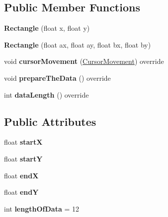 \subsection*{Public Member Functions}
\begin{DoxyCompactItemize}
\item 
{\bfseries Rectangle} (float x, float y)\hypertarget{classRectangle_afcbe2665892e9ed1d32a7400ab1b9160}{}\label{classRectangle_afcbe2665892e9ed1d32a7400ab1b9160}

\item 
{\bfseries Rectangle} (float ax, float ay, float bx, float by)\hypertarget{classRectangle_a16be353bdd049c8f642cd7d3b4156be5}{}\label{classRectangle_a16be353bdd049c8f642cd7d3b4156be5}

\item 
void {\bfseries cursor\+Movement} (\hyperlink{classCursorMovement}{Cursor\+Movement}) override\hypertarget{classRectangle_a45934f6a755e957b821e33bafaff2da8}{}\label{classRectangle_a45934f6a755e957b821e33bafaff2da8}

\item 
void {\bfseries prepare\+The\+Data} () override\hypertarget{classRectangle_a1d1cae3a05652d498f20b3a747082347}{}\label{classRectangle_a1d1cae3a05652d498f20b3a747082347}

\item 
int {\bfseries data\+Length} () override\hypertarget{classRectangle_ac53e8b8a9c1e0df7c36d5d9d83070968}{}\label{classRectangle_ac53e8b8a9c1e0df7c36d5d9d83070968}

\end{DoxyCompactItemize}
\subsection*{Public Attributes}
\begin{DoxyCompactItemize}
\item 
float {\bfseries startX}\hypertarget{classRectangle_a1999e2aa3c8ee35d2f57f90cb376b7c6}{}\label{classRectangle_a1999e2aa3c8ee35d2f57f90cb376b7c6}

\item 
float {\bfseries startY}\hypertarget{classRectangle_a0620f8b1b4a30cfd3bcc826811916a13}{}\label{classRectangle_a0620f8b1b4a30cfd3bcc826811916a13}

\item 
float {\bfseries endX}\hypertarget{classRectangle_aa250ce84a1649311b750558201b2bfc5}{}\label{classRectangle_aa250ce84a1649311b750558201b2bfc5}

\item 
float {\bfseries endY}\hypertarget{classRectangle_abf43dca674d8142c428448283b4274c8}{}\label{classRectangle_abf43dca674d8142c428448283b4274c8}

\item 
int {\bfseries length\+Of\+Data} = 12\hypertarget{classRectangle_a4fbb1c8e4315a2fba2242959ba8bf4fa}{}\label{classRectangle_a4fbb1c8e4315a2fba2242959ba8bf4fa}

\end{DoxyCompactItemize}
